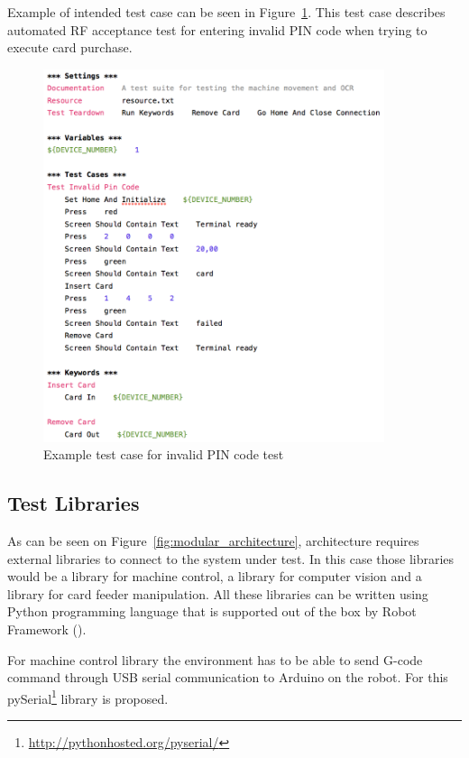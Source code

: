 Example of intended test case can be seen in Figure~\ref{fig:invalid_pin_test}. This test case describes automated RF acceptance test for entering invalid PIN code when trying to execute card purchase.

\begin{figure}[ht]
  \begin{center}
    \includegraphics[width=10cm]{images/example_test.png}
    \caption{Example test case for invalid PIN code test}
    \label{fig:invalid_pin_test}
  \end{center}
\end{figure}

\FloatBarrier
\subsection{Test Libraries}
\label{subsection:test libraries}

As can be seen on Figure~\ref{fig:modular_architecture}, architecture requires external libraries to connect to the system under test. In this case those libraries would be a library for machine control, a library for computer vision and a library for card feeder manipulation. All these libraries can be written using Python programming language that is supported out of the box by Robot Framework (\emph{\cite{robotframework}}).

For machine control library the environment has to be able to send G-code command through USB serial communication to Arduino on the robot. For this pySerial\footnote{\url{http://pythonhosted.org/pyserial/}} library is proposed.

